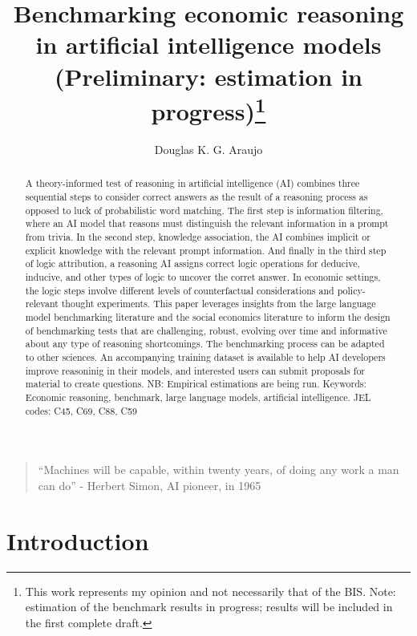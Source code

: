 \documentclass[
]{article}
\title{Benchmarking economic reasoning in artificial intelligence models
(Preliminary: estimation in progress)\thanks{This work represents my
opinion and not necessarily that of the BIS. Note: estimation of the
benchmark results in progress; results will be included in the first
complete draft.}}
\author{Douglas K. G. Araujo}
\affil{%
                  Bank for International
Settlements, douglas.araujo@bis.org
              }
\date{}
\begin{document}
\maketitle
\begin{abstract}
A theory-informed test of reasoning in artificial intelligence (AI)
combines three sequential steps to consider correct answers as the
result of a reasoning process as opposed to luck of probabilistic word
matching. The first step is information filtering, where an AI model
that reasons must distinguish the relevant information in a prompt from
trivia. In the second step, knowledge association, the AI combines
implicit or explicit knowledge with the relevant prompt information. And
finally in the third step of logic attribution, a reasoning AI assigns
correct logic operations for deducive, inducive, and other types of
logic to uncover the corret answer. In economic settings, the logic
steps involve different levels of counterfactual considerations and
policy-relevant thought experiments. This paper leverages insights from
the large language model benchmarking literature and the social
economics literature to inform the design of benchmarking tests that are
challenging, robust, evolving over time and informative about any type
of reasoning shortcomings. The benchmarking process can be adapted to
other sciences. An accompanying training dataset is available to help AI
developers improve reasoninig in their models, and interested users can
submit proposals for material to create questions. NB: Empirical
estimations are being run. Keywords: Economic reasoning, benchmark,
large language models, artificial intelligence. JEL codes: C45, C69,
C88, C59
\end{abstract}

\begin{quote}
``Machines will be capable, within twenty years, of doing any work a man
can do'' - Herbert Simon, AI pioneer, in 1965
\end{quote}

\section{Introduction}\label{introduction}
\end{document}
